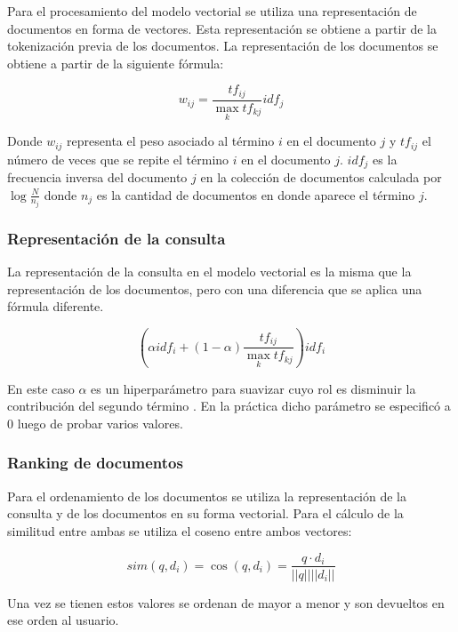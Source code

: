\documentclass[runningheads]{llncs}
\begin{document}
Para el procesamiento del modelo vectorial se utiliza una representación de documentos en forma de
vectores. Esta representación se obtiene a partir de la tokenización previa de los documentos. La
representación de los documentos se obtiene a partir de la siguiente fórmula:

\begin{equation}
    w_{ij} = \frac{tf_{ij}}{\max_{k} tf_{kj}}idf_{j}
\end{equation}

Donde $w_{ij}$ representa el peso asociado al término $i$ en el documento $j$ y $tf_{ij}$ el número de veces que
se repite el término $i$ en el documento $j$. $idf_{j}$ es la frecuencia inversa del documento $j$ en la
colección de documentos calculada por $\log{\frac{N}{n_j}}$ donde $n_j$ es la cantidad de documentos
en donde aparece el término $j$.

\subsubsection{Representación de la consulta}

La representación de la consulta en el modelo vectorial es la misma que la representación de los 
documentos, pero con una diferencia que se aplica una fórmula diferente.

\begin{equation}
    (\alpha idf_i + (1-\alpha)\frac{tf_{ij}}{\max_{k} tf_{kj}}) idf_i
\end{equation}

En este caso $\alpha$ es un hiperparámetro para suavizar cuyo rol es disminuir
la contribución del segundo término \cite{alphaManning}. En la práctica dicho parámetro
se especificó a 0 luego de probar varios valores.

\subsubsection{Ranking de documentos}

Para el ordenamiento de los documentos se utiliza la representación de la consulta y de los documentos
en su forma vectorial. Para el cálculo de la similitud entre ambas se utiliza el coseno entre
ambos vectores:

\begin{equation}
    sim(q,d_i) = \cos(q, d_i) = \frac{q \cdot d_i}{||q|| ||d_i||}
\end{equation}

Una vez se tienen estos valores se ordenan de mayor a menor y son devueltos en ese orden al
usuario.
\end{document}
